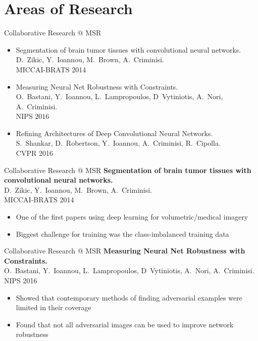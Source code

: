 \documentclass[t,xcolor=dvipsnames]{beamer}
\begin{document}
\usebackgroundtemplate{}

\section{Areas of Research}
\begin{frame}{Collaborative Research @ MSR}
\begin{itemize}
    \item Segmentation of brain tumor tissues with convolutional neural networks.\\{\footnotesize D.\ Zikic, Y.\ Ioannou, M.\ Brown, A.\ Criminisi.\\MICCAI-BRATS 2014}
    \item Measuring Neural Net Robustness with Constraints.\\{\footnotesize O.\ Bastani, Y.\ Ioannou, L.\ Lampropoulos, D\ Vytiniotis, A.\ Nori, A.\ Criminisi.\\NIPS 2016}
    \item Refining Architectures of Deep Convolutional Neural Networks.\\{\footnotesize 
S.\ Shankar, D.\ Robertson, Y.\ Ioannou, A.\ Criminisi, R.\ Cipolla.\\CVPR 2016}
\end{itemize}
\end{frame}

\begin{frame}{Collaborative Research @ MSR}
\textbf{Segmentation of brain tumor tissues with convolutional neural networks.}\\{\footnotesize D.\ Zikic, Y.\ Ioannou, M.\ Brown, A.\ Criminisi.\\MICCAI-BRATS 2014}
\begin{itemize}
    \item One of the first papers using deep learning for volumetric/medical imagery
    \item Biggest challenge for training was the class-imbalanced training data
\end{itemize}
\end{frame}

\begin{frame}{Collaborative Research @ MSR}
\textbf{Measuring Neural Net Robustness with Constraints.}\\{\footnotesize O.\ Bastani, Y.\ Ioannou, L.\ Lampropoulos, D\ Vytiniotis, A.\ Nori, A.\ Criminisi.\\NIPS 2016}
\begin{itemize}
    \item Showed that contemporary methods of finding adversarial examples were limited in their coverage
    \item Found that not all adversarial images can be used to improve network robustness
\end{itemize}
\end{frame}
\end{document}
